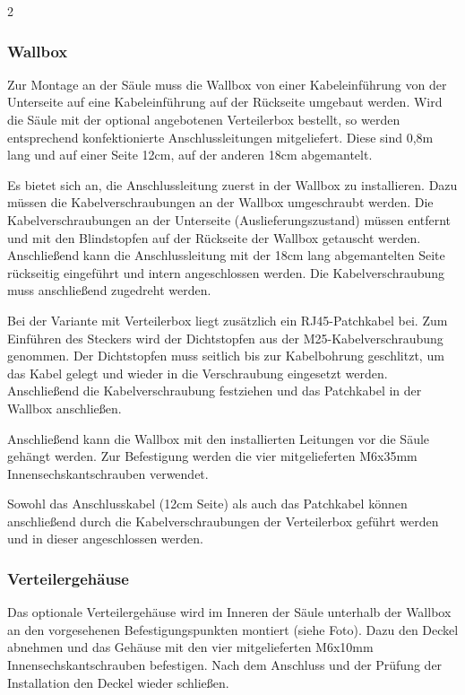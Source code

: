 \documentclass[a4paper,10pt]{article}
\begin{document}
\begin{multicols}{2}
	\subsubsection{Wallbox}
	Zur Montage an der Säule muss die Wallbox von einer Kabeleinführung von der
	Unterseite auf eine Kabeleinführung auf der Rückseite umgebaut werden. Wird
	die Säule mit der optional angebotenen Verteilerbox bestellt, so werden
	entsprechend konfektionierte Anschlussleitungen mitgeliefert.
    Diese sind 0,8m lang und auf einer Seite 12cm, auf der anderen 18cm abgemantelt.
    \par
    Es bietet sich an, die Anschlussleitung 	zuerst in der Wallbox zu installieren.
    Dazu müssen die Kabelverschraubungen an der Wallbox umgeschraubt werden. Die
    Kabelverschraubungen an der Unterseite (Auslieferungszustand) müssen entfernt
    und mit den Blindstopfen auf der Rückseite der Wallbox getauscht werden.
    Anschließend kann die Anschlussleitung mit der 18cm lang abgemantelten Seite
    rückseitig eingeführt und intern angeschlossen werden. Die Kabelverschraubung
    muss anschließend zugedreht werden.
    \par
    Bei der Variante mit Verteilerbox liegt zusätzlich ein RJ45-Patchkabel bei.
    Zum Einführen des Steckers wird der Dichtstopfen aus der M25-Kabelverschraubung
    genommen. Der Dichtstopfen muss seitlich bis zur Kabelbohrung geschlitzt,
    um das Kabel gelegt und wieder in die Verschraubung eingesetzt werden.
    Anschließend die Kabelverschraubung festziehen und das Patchkabel in der
    Wallbox anschließen.
	\par
	Anschließend kann die Wallbox mit den installierten Leitungen vor die Säule
	gehängt werden. Zur Befestigung werden die vier mitgelieferten M6x35mm
	Innensechskantschrauben verwendet.
    \par
    Sowohl das Anschlusskabel (12cm Seite) als auch das Patchkabel können anschließend
    durch die Kabelverschraubungen der Verteilerbox geführt werden und in dieser angeschlossen werden.

	\subsubsection{Verteilergehäuse}

	Das optionale Verteilergehäuse wird im Inneren der Säule unterhalb der Wallbox
	an den vorgesehenen Befestigungspunkten montiert (siehe Foto).
	Dazu den Deckel abnehmen und das Gehäuse mit den vier mitgelieferten
	M6x10mm Innensechskantschrauben befestigen. Nach dem Anschluss und der
	Prüfung der Installation den Deckel wieder schließen.


\end{multicols}
\end{document}
